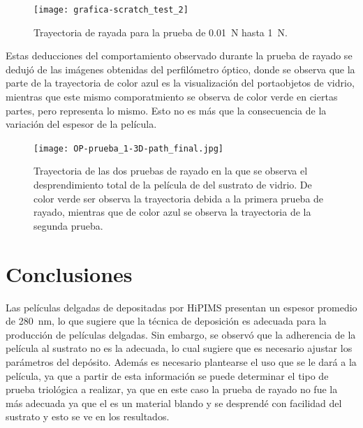 \documentclass[12pt]{IEEEtran}
\begin{document}
\begin{figure}[htb]
	\centering
	\texttt{[image: grafica-scratch\_test\_2]}
	\caption{Trayectoria de rayada para la prueba de \qty{0.01}{\N} hasta \qty{1}{\N}.}
	\label{fig:scratch-test-2}
\end{figure}

Estas deducciones del comportamiento observado durante la prueba de rayado se dedujó de las imágenes obtenidas del perfilómetro óptico, donde se observa que la parte de la trayectoria de color azul es la visualización del portaobjetos de vidrio, mientras que este mismo comporatmiento se observa de color verde en ciertas partes, pero representa lo mismo. Esto no es más que la consecuencia de la variación del espesor de la película.

\begin{figure}[htb]
	\centering
	\texttt{[image: OP-prueba\_1-3D-path\_final.jpg]}
	\caption{Trayectoria de las dos pruebas de rayado en la que se observa el desprendimiento total de la película de  del sustrato de vidrio. De color verde ser observa la trayectoria debida a la primera prueba de rayado, mientras que de color azul se observa la trayectoria de la segunda prueba.}
\end{figure}

\section{Conclusiones}

Las películas delgadas de  depositadas por HiPIMS presentan un espesor promedio de \qty{280}{\nm}, lo que sugiere que la técnica de deposición es adecuada para la producción de películas delgadas. Sin embargo, se observó que la adherencia de la película al sustrato no es la adecuada, lo cual sugiere que es necesario ajustar los parámetros del depósito. Además es necesario plantearse el uso que se le dará a la película, ya que a partir de esta información se puede determinar el tipo de prueba triológica a realizar, ya que en este caso la prueba de rayado no fue la más adecuada ya que el  es un material blando y  se desprendé con facilidad del sustrato y esto se ve en los resultados.

\nocite{*}
\printbibliography
\end{document}
